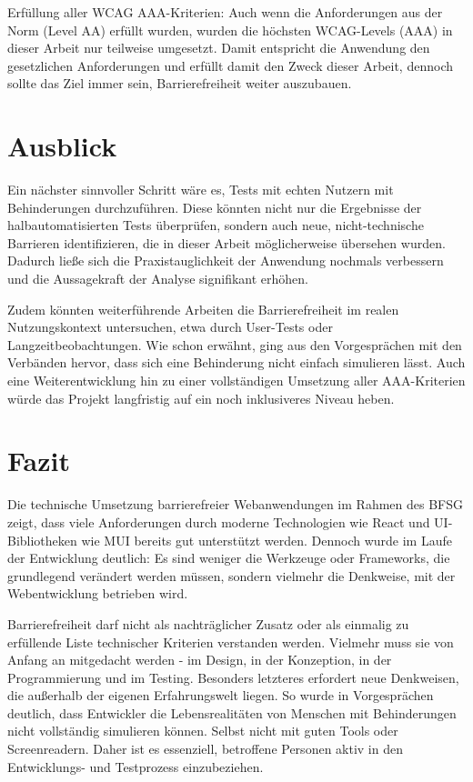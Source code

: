Erfüllung aller WCAG AAA-Kriterien: Auch wenn die Anforderungen aus der Norm (Level AA) erfüllt wurden, wurden die höchsten WCAG-Levels (AAA) in dieser Arbeit nur teilweise umgesetzt. Damit entspricht die Anwendung den gesetzlichen Anforderungen und erfüllt damit den Zweck dieser Arbeit, dennoch sollte das Ziel immer sein, Barrierefreiheit weiter auszubauen.

\section{Ausblick}
Ein nächster sinnvoller Schritt wäre es, Tests mit echten Nutzern mit Behinderungen durchzuführen. Diese könnten nicht nur die Ergebnisse der halbautomatisierten Tests überprüfen, sondern auch neue, nicht-technische Barrieren identifizieren, die in dieser Arbeit möglicherweise übersehen wurden. Dadurch ließe sich die Praxistauglichkeit der Anwendung nochmals verbessern und die Aussagekraft der Analyse signifikant erhöhen.

Zudem könnten weiterführende Arbeiten die Barrierefreiheit im realen Nutzungskontext untersuchen, etwa durch User-Tests oder Langzeitbeobachtungen. Wie schon erwähnt, ging aus den Vorgesprächen mit den Verbänden hervor, dass sich eine Behinderung nicht einfach simulieren lässt.  Auch eine Weiterentwicklung hin zu einer vollständigen Umsetzung aller AAA-Kriterien würde das Projekt langfristig auf ein noch inklusiveres Niveau heben.

\section{Fazit}
Die technische Umsetzung barrierefreier Webanwendungen im Rahmen des BFSG zeigt, dass viele Anforderungen durch moderne Technologien wie React und UI-Bibliotheken wie MUI bereits gut unterstützt werden. Dennoch wurde im Laufe der Entwicklung deutlich: Es sind weniger die Werkzeuge oder Frameworks, die grundlegend verändert werden müssen, sondern vielmehr die Denkweise, mit der Webentwicklung betrieben wird.

Barrierefreiheit darf nicht als nachträglicher Zusatz oder als einmalig zu erfüllende Liste technischer Kriterien verstanden werden. Vielmehr muss sie von Anfang an mitgedacht werden - im Design, in der Konzeption, in der Programmierung und im Testing. Besonders letzteres erfordert neue Denkweisen, die außerhalb der eigenen Erfahrungswelt liegen. So wurde in Vorgesprächen deutlich, dass Entwickler die Lebensrealitäten von Menschen mit Behinderungen nicht vollständig simulieren können. Selbst nicht mit guten Tools oder Screenreadern. Daher ist es essenziell, betroffene Personen aktiv in den Entwicklungs- und Testprozess einzubeziehen.

